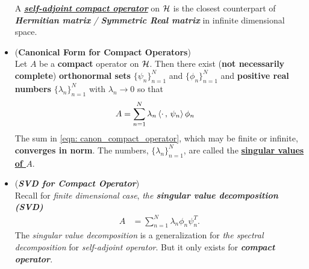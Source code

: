 \documentclass[11pt]{article}
\begin{document}
\begin{itemize}
\begin{remark}
A \underline{\textbf{\emph{self-adjoint compact operator}}} on ${\mathcal H}$ is the closest counterpart of \emph{\textbf{Hermitian matrix} / \textbf{Symmetric Real matrix}} in infinite dimensional space.
\end{remark}

\item \begin{theorem}(\textbf{Canonical Form for Compact Operators})   \citep{reed1980methods}\\
Let $A$ be a \textbf{compact} operator on ${\mathcal H}$. Then there exist (\textbf{not necessarily complete}) \textbf{orthonormal sets} $\{\psi_n\}_{n=1}^{N}$ and $\{\phi_n\}_{n=1}^{N}$ and \textbf{positive real numbers} $\{\lambda_n\}_{n=1}^{N}$ with $\lambda_n \rightarrow 0$ so that 
\begin{align}
A &= \sum_{n=1}^{N}\lambda_n\left\langle \cdot\,,\, \psi_n \right\rangle\phi_n \label{eqn: canon_compact_operator}
\end{align}
The sum in \eqref{eqn: canon_compact_operator}, which may be finite or infinite, \textbf{converges in norm}. The numbers, $\{\lambda_n\}_{n=1}^{N}$, are called the \underline{\textbf{singular values of $A$}}. 
\end{theorem}

\item \begin{remark} (\emph{\textbf{SVD for Compact Operator}})\\
Recall for \emph{finite dimensional case}, \emph{the \textbf{singular value decomposition (SVD)}}
\begin{align*}
A &= \sum_{n=1}^{N}\lambda_n\phi_n \psi_n^{T}.
\end{align*} The \emph{singular value decomposition} is a generalization for \emph{the spectral decomposition} for \emph{self-adjoint operator}. But it only exists for \emph{\textbf{compact operator}}.
\end{remark}
\end{itemize}
\end{document}
